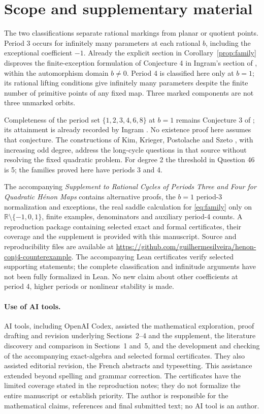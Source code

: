 \documentclass{jT}
\newcommand{\R}{\mathbb R}
\begin{document}
\section{Scope and supplementary material}\label{sec:discussion}
The two classifications separate rational markings from planar or quotient points. Period 3 occurs for infinitely many parameters at each rational $b$, including the exceptional coefficient $-1$. Already the explicit section in Corollary~\ref{prop:family} disproves the finite-exception formulation of Conjecture 4 in Ingram's section of \cite{problems}, within the automorphism domain $b\ne0$. Period 4 is classified here only at $b=1$; its rational lifting conditions give infinitely many parameters despite the finite number of primitive points of any fixed map. Three marked components are not three unmarked orbits.

Completeness of the period set $\{1,2,3,4,6,8\}$ at $b=1$ remains Conjecture 3 of \cite[\S11]{problems}; its attainment is already recorded by Ingram \cite[p.~4]{ingram}. No existence proof here assumes that conjecture. The constructions of Kim, Krieger, Postolache and Szeto \cite[Theorems A--B]{kim}, with increasing odd degree, address the long-cycle questions in that source without resolving the fixed quadratic problem. For degree 2 the threshold in Question 46 is 5; the families proved here have periods 3 and 4.

The accompanying \emph{Supplement to Rational Cycles of Periods Three and Four for Quadratic H\'enon Maps} contains alternative proofs, the $b=1$ period-3 normalization and exceptions, the real saddle calculation for \eqref{eq:family} only on $\R\setminus\{-1,0,1\}$, finite examples, denominators and auxiliary period-4 counts. A reproduction package containing selected exact and formal certificates, their coverage and the supplement is provided with this manuscript. Source and reproducibility files are available at \url{https://github.com/guilhermesilveira/henon-conj4-counterexample}. The accompanying Lean certificates verify selected supporting statements; the complete classification and infinitude arguments have not been fully formalized in Lean. No new claim about other coefficients at period 4, higher periods or nonlinear stability is made.


\paragraph{Use of AI tools.}
AI tools, including OpenAI Codex, assisted the mathematical exploration,
proof drafting and revision underlying Sections~2--4 and the supplement,
the literature discovery and comparison in Sections~1 and~5, and the
development and checking of the accompanying exact-algebra and selected
formal certificates. They also assisted editorial revision, the French
abstracts and typesetting. This assistance extended beyond spelling and
grammar correction. The certificates have the limited coverage stated in
the reproduction notes; they do not formalize the entire manuscript or
establish priority. The author is responsible for the mathematical claims,
references and final submitted text; no AI tool is an author.
\end{document}
